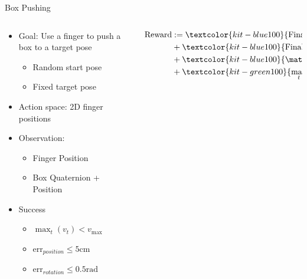\documentclass[16:9,en,navbarinfooter]{sdqbeamer}
\begin{document}
\begin{frame}{Box Pushing}

\begin{columns}[t]
    \begin{column}{0.4\textwidth}
        \vspace{1cm}
        \begin{itemize}
            \item Goal: Use a finger to push a box to a target pose
                \begin{itemize}
                    \item Random start pose
                    \item Fixed target pose
                \end{itemize}
            \item Action space: 2D finger positions
            \item Observation:
                \begin{itemize}
                    \item Finger Position
                    \item Box Quaternion + Position
                \end{itemize}
            \item Success
                \begin{itemize}
                \item $\max_t(v_t) < v_\text{max}$
                \item $\text{err}_{position} \leq 5 \text{cm}$
                \item $\text{err}_{rotation} \leq 0.5 \text{rad}$
                \end{itemize}
        \end{itemize}
            \vspace{1em}
    \end{column}
    \begin{column}{0.5\textwidth}
        \vspace{.5cm}
        \[
        \begin{aligned}
            \text{Reward} &:= \textcolor{kit-blue100}{\text{Final Euclidean Distance}} \\
             &+  \textcolor{kit-blue100}{\text{Final Rotational Distance}} \\
             &+  \textcolor{kit-blue100}{\mathds{1} \left\{\text{success}\right\} } \\
             &+  \textcolor{kit-green100}{\max_t\  \text{step}(v_t)} \\

\end{aligned}\]
\end{column}
\end{columns}
\end{frame}
\end{document}
